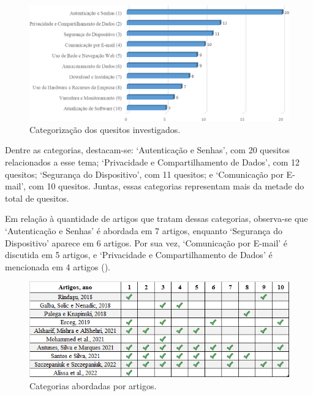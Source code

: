 \documentclass[portuguese]{textolivre}
\begin{document}
\begin{figure}[htbp]
\centering
\begin{minipage}{0.85\linewidth}
  \includegraphics[width=\linewidth]{Fig6.png}
  \caption{Categorização dos quesitos investigados.}
  \label{fig6}
\end{minipage}
\end{figure}

Dentre as categorias, destacam-se: ‘Autenticação e Senhas’, com 20 quesitos relacionados a esse tema; ‘Privacidade e Compartilhamento de Dados’, com 12 quesitos; ‘Segurança do Dispositivo’, com 11 quesitos; e ‘Comunicação por E-mail’, com 10 quesitos. Juntas, essas categorias representam mais da metade do total de quesitos.
 
Em relação à quantidade de artigos que tratam dessas categorias, observa-se que ‘Autenticação e Senhas’ é abordada em 7 artigos, enquanto ‘Segurança do Dispositivo’ aparece em 6 artigos. Por sua vez, ‘Comunicação por E-mail’ é discutida em 5 artigos, e ‘Privacidade e Compartilhamento de Dados’ é mencionada em 4 artigos ().

\begin{figure}[htbp]
\centering
\begin{minipage}{0.85\linewidth}
  \includegraphics[width=\linewidth]{Fig7.png}
  \caption{Categorias abordadas por artigos.}
  \label{fig7}
\end{minipage}
\end{figure}
\end{document}
